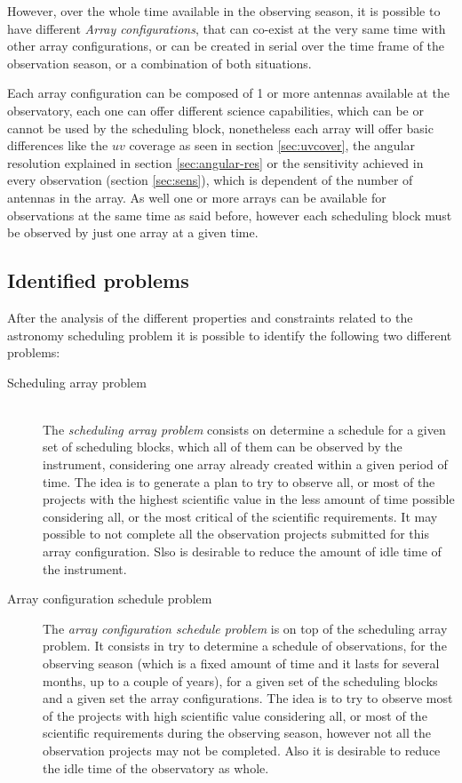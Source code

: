 However, over the whole time available in the observing season, it is possible to have different \textit{Array configurations}, that can co-exist at the very same time with other array configurations, or can be created in serial over the time frame of the observation season, or a combination of both situations.

Each array configuration can be composed of 1 or more antennas available at the observatory, each one can offer different science capabilities, which can be or cannot be used by the scheduling block, nonetheless each array will offer basic differences like the $uv$ coverage as seen in section \ref{sec:uvcover}, the angular resolution explained in section \ref{sec:angular-res} or the sensitivity achieved in every observation (section \ref{sec:sens}), which is dependent of the number of antennas in the array. As well one or more arrays can be available for observations at the same time as said before, however each scheduling block must be observed by just one array at a given time.

\subsection{Identified problems}
\label{sec:problems}
After the analysis of the different properties and constraints related to the astronomy scheduling problem it is possible to identify the following two different problems:
\begin{description}

\item[Scheduling array problem] \hfill \\
The \textit{scheduling array problem} consists on determine a schedule for a given set of scheduling blocks, which all of them can be observed by the instrument, considering one array already created within a given period of time. 
The idea is to generate a plan to try to observe all, or most of the projects with the highest scientific value in the less amount of time possible considering all, or the most critical of the scientific requirements. It may possible to not complete all the observation projects submitted for this array configuration. Slso is desirable to reduce the amount of idle time of the instrument.

\item[Array configuration schedule problem]

The \textit{array configuration schedule problem} is on top of the scheduling array problem. It consists in try to determine a schedule of observations, for the observing season (which is a fixed amount of time and it lasts for several months, up to a couple of years), for a given set of the scheduling blocks and a given set the array configurations. The idea is to try to observe most of the projects with high scientific value considering all, or most of the scientific requirements during the observing season, however not all the observation projects may not be completed. Also it is desirable to reduce the idle time of the observatory as whole.
\end{description}


